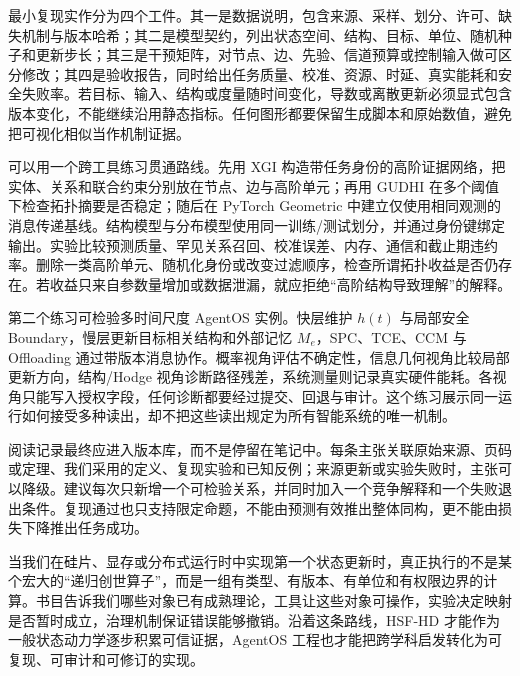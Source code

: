 最小复现实作分为四个工件。其一是数据说明，包含来源、采样、划分、许可、缺失机制与版本哈希；其二是模型契约，列出状态空间、结构、目标、单位、随机种子和更新步长；其三是干预矩阵，对节点、边、先验、信道预算或控制输入做可区分修改；其四是验收报告，同时给出任务质量、校准、资源、时延、真实能耗和安全失败率。若目标、输入、结构或度量随时间变化，导数或离散更新必须显式包含版本变化，不能继续沿用静态指标。任何图形都要保留生成脚本和原始数值，避免把可视化相似当作机制证据。

可以用一个跨工具练习贯通路线。先用 XGI 构造带任务身份的高阶证据网络，把实体、关系和联合约束分别放在节点、边与高阶单元；再用 GUDHI 在多个阈值下检查拓扑摘要是否稳定；随后在 PyTorch Geometric 中建立仅使用相同观测的消息传递基线。结构模型与分布模型使用同一训练/测试划分，并通过身份键绑定输出。实验比较预测质量、罕见关系召回、校准误差、内存、通信和截止期违约率。删除一类高阶单元、随机化身份或改变过滤顺序，检查所谓拓扑收益是否仍存在。若收益只来自参数量增加或数据泄漏，就应拒绝“高阶结构导致理解”的解释。

第二个练习可检验多时间尺度 AgentOS 实例。快层维护 $h(t)$ 与局部安全 Boundary，慢层更新目标相关结构和外部记忆 $M_e$，SPC、TCE、CCM 与 Offloading 通过带版本消息协作。概率视角评估不确定性，信息几何视角比较局部更新方向，结构/Hodge 视角诊断路径残差，系统测量则记录真实硬件能耗。各视角只能写入授权字段，任何诊断都要经过提交、回退与审计。这个练习展示同一运行如何接受多种读出，却不把这些读出规定为所有智能系统的唯一机制。

阅读记录最终应进入版本库，而不是停留在笔记中。每条主张关联原始来源、页码或定理、我们采用的定义、复现实验和已知反例；来源更新或实验失败时，主张可以降级。建议每次只新增一个可检验关系，并同时加入一个竞争解释和一个失败退出条件。复现通过也只支持限定命题，不能由预测有效推出整体同构，更不能由损失下降推出任务成功。

当我们在硅片、显存或分布式运行时中实现第一个状态更新时，真正执行的不是某个宏大的“递归创世算子”，而是一组有类型、有版本、有单位和有权限边界的计算。书目告诉我们哪些对象已有成熟理论，工具让这些对象可操作，实验决定映射是否暂时成立，治理机制保证错误能够撤销。沿着这条路线，HSF-HD 才能作为一般状态动力学逐步积累可信证据，AgentOS 工程也才能把跨学科启发转化为可复现、可审计和可修订的实现。
